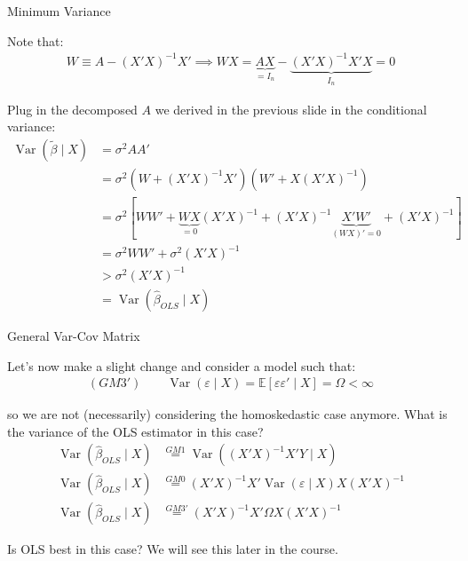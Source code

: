 \begin{frame}{Minimum Variance}

    Note that:
    \begin{align*}
        W \equiv A - (X'X)^{-1} X' \implies W X = \underbrace{AX}_{= I_n} - \underbrace{(X'X)^{-1} X' X}_{I_n} = 0
    \end{align*}

    Plug in the decomposed $A$ we derived in the previous slide in the conditional variance:
    \begin{align*}
        \operatorname{Var} (\tilde{\beta} \mid X) &= \sigma^2 A A'
        \\
        &= \sigma^2 (W + (X'X)^{-1} X') (W' + X (X'X)^{-1} )
        \\
        &= \sigma^2 [W W' + \underbrace{W X}_{=0} (X'X)^{-1} + (X'X)^{-1} \underbrace{X' W'}_{(WX)'=0} + (X'X)^{-1} ]
        \\
        &= \sigma^2 WW' + \sigma^2 (X'X)^{-1}
        \\
        &> \sigma^2 (X'X)^{-1}
        \\
        &= \operatorname{Var}(\hat{\beta}_{OLS} \mid X)
    \end{align*}
    
\end{frame}

\begin{frame}{General Var-Cov Matrix}

    Let's now make a slight change and consider a model such that:
    \begin{align*}
        (GM3') \qquad \operatorname{Var}(\varepsilon \mid X) = \mathbb{E}[ \varepsilon \varepsilon' \mid X] = \Omega < \infty
    \end{align*}

    so we are not (necessarily) considering the homoskedastic case anymore. What is the variance of the OLS estimator in this case?
    \begin{align*}
        \operatorname{Var}(\hat{\beta}_{OLS} \mid X ) &\overset{GM1}{=} \operatorname{Var}( (X'X)^{-1} X' Y \mid X)
        \\
        \operatorname{Var}(\hat{\beta}_{OLS} \mid X ) &\overset{GM0}{=} (X'X)^{-1} X' \operatorname{Var}( \varepsilon \mid X) X (X'X)^{-1}
        \\
        \operatorname{Var}(\hat{\beta}_{OLS} \mid X ) &\overset{GM3'}{=} (X'X)^{-1} X' \Omega X (X'X)^{-1}
    \end{align*}
    
    Is OLS best in this case? We will see this later in the course.
    
\end{frame}

